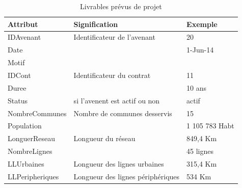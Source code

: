 \documentclass[a4paper]{report}
\begin{document}
\begin{doublespace}
	\begin{table}[H]
		\begin{center}
			\begin{tabularx}{17.5cm}{|X|X|X|}
				\hline
				\textbf{Attribut} & \textbf{Signification}            &
				\textbf{Exemple}                                                       \\
				\hline
				IDAvenant         & Identificateur de l'avenant       & 20             \\
				\hline
				Date              &                                   & 1-Jun-14       \\
				\hline
				Motif             &                                   &                \\
				\hline
				IDCont            & Identificateur du contrat         & 11             \\
				\hline
				Duree             &                                   & 10 ans         \\
				\hline
				Status            & si l'avenent est actif ou non     & actif          \\
				\hline
				NombreCommunes    & Nombre de communes desservis      & 15             \\
				\hline
				Population        &                                   & 1 105 783 Habt \\
				\hline
				LonguerReseau     & Longueur du réseau                & 849,4 Km       \\
				\hline
				NombreLignes      &                                   & 45 lignes      \\
				\hline
				LLUrbaines        & Longueur des lignes urbaines      & 315,4 Km       \\
				\hline
				LLPeripheriques   & Longueur des lignes périphériques & 534
				Km                                                                     \\
				\hline
			\end{tabularx}
			\caption{Livrables prévus de projet}
		\end{center}
	\end{table}


\end{doublespace}
\end{document}
